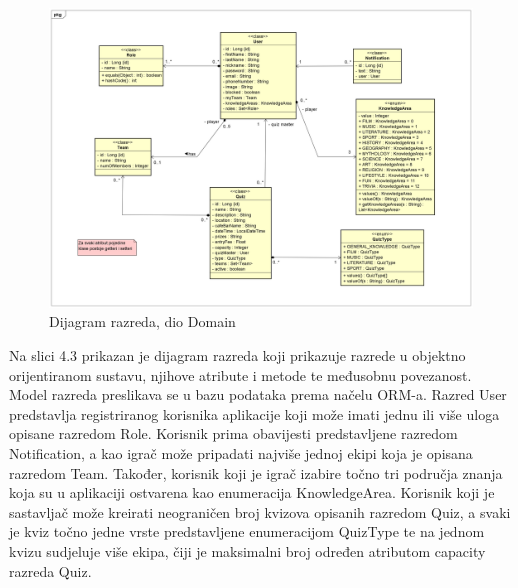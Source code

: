 			\begin{figure}[H]
				\includegraphics[width=\textwidth]{dijagrami/classDiagram1.PNG} 
				\caption{Dijagram razreda, dio Domain}
				\label{fig:classDiagram1}
			\end{figure}
		
			Na slici 4.3 prikazan je dijagram razreda koji prikazuje razrede u objektno orijentiranom sustavu, njihove atribute i metode te međusobnu povezanost. Model razreda preslikava se u bazu podataka prema načelu ORM-a. Razred User predstavlja registriranog korisnika aplikacije koji može imati jednu ili više uloga opisane razredom Role. Korisnik prima obavijesti predstavljene razredom Notification, a kao igrač može pripadati najviše jednoj ekipi koja je opisana razredom Team. Također, korisnik koji je igrač izabire točno tri područja znanja koja su u aplikaciji ostvarena kao enumeracija KnowledgeArea. Korisnik koji je sastavljač može kreirati neograničen broj kvizova opisanih razredom Quiz, a svaki je kviz točno jedne vrste predstavljene enumeracijom QuizType te na jednom kvizu sudjeluje više ekipa, čiji je maksimalni broj određen atributom capacity razreda Quiz. 
			
		
			
